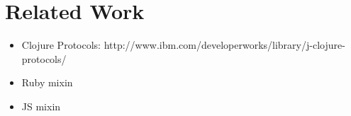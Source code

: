 \section{Related Work}

\begin{itemize}
\item Clojure Protocols: http://www.ibm.com/developerworks/library/j-clojure-protocols/
\item Ruby mixin
\item JS mixin
\end{itemize}
